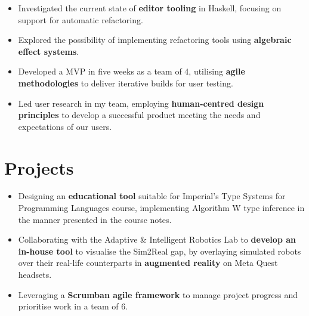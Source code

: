 \documentclass[10pt]{article}
\begin{document}
\begin{itemize}
  \item Investigated the current state of \textbf{editor tooling} in Haskell, focusing on support for automatic refactoring.
  \item Explored the possibility of implementing refactoring tools using \textbf{algebraic effect systems}.
\end{itemize}
\entrysep

\begin{itemize}
  \item Developed a MVP in five weeks as a team of 4, utilising \textbf{agile methodologies} to deliver iterative builds for user testing.
  \item Led user research in my team, employing \textbf{human-centred design principles} to develop a successful product meeting the needs and expectations of our users.
\end{itemize}

\section{Projects}

\begin{itemize}
  \item Designing an \textbf{educational tool} suitable for Imperial's Type Systems for Programming Languages course, implementing Algorithm W type inference in the manner presented in the course notes.
\end{itemize}
\entrysep

\begin{itemize}
  \item Collaborating with the Adaptive \& Intelligent Robotics Lab to \textbf{develop an in-house tool} to visualise the Sim2Real gap, by overlaying simulated robots over their real-life counterparts in \textbf{augmented reality} on Meta Quest headsets.
  \item Leveraging a \textbf{Scrumban agile framework} to manage project progress and prioritise work in a team of 6.
\end{itemize}
\entrysep
\end{document}
